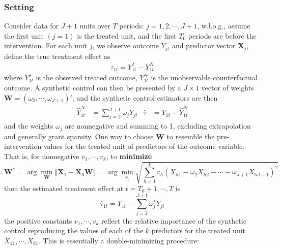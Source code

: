 \documentclass[twoside]{article}
\begin{document}
\subsubsection{Setting}
Consider data for $J+1$ units over $T$ periods: $j=1,2,\cdots,J+1$, w.l.o.g., assume the first unit $(j=1)$ is the treated unit, and the first $T_0$ periods are before the intervention. For each unit $j$, we observe outcome $Y_{jt}$ and predictor vector $\mathbf{X}_{j}$, define the true treatment effect as 
\begin{align*}
    \tau_{1t} = Y^I_{1t} - Y^N_{1t}
\end{align*}
where $Y^{I}_{1t}$ is the observed treated outcome, $Y^{N}_{1t}$ is the unobservable counterfactual outcome. A synthetic control can then be presented by a $J\times 1$ vector of weights $\mathbf{W}=\left(\omega_2,\cdots,\omega_{J+1}\right)'$, and the synthetic control estimators are then 
\begin{align*}
    \hat{Y}^N_{1t} &= \sum^{J+1}_{j=2}\omega_j Y_{jt} & \hat{\tau} &= Y_{1t}-\hat{Y}^N_{1t}
\end{align*}
and the weights $\omega_j$ are nonnegative and summing to 1, excluding extrapolation and generally grant sparsity.
One way to choose $\mathbf{W}$ to resemble the pre-intervention values for the treated unit of predictors of the outcome variable. 
That is, for nonnegative $v_1,\cdots,v_k$, to \textbf{minimize}
\begin{equation}\label{eq:synthetic_control_weight}
    \mathbf{W}^* = \arg\min_{\mathbf{W}} \left\Vert \mathbf{X}_1 - \mathbf{X}_0\mathbf{W} \right\Vert = \arg\min_{\omega_{j}} \sqrt{ \sum^k_{h=1}v_h \left(X_{h1}-\omega_2 X_{h2} - \cdots - \omega_{J+1} X_{hJ+1} \right)^2 }
\end{equation}
then the estimated treatment effect at $t=T_0+1,\cdots,T$ is $$ \hat{\tau}_{1t} = Y_{1t} - \sum^{J+1}_{j=2}\omega^*_j Y_{jt} $$
the positive constants $v_1,\cdots,v_k$ reflect the relative importance of the synthetic control reproducing the values of each of the $k$ predictors for the treated unit $X_{11},\cdots,X_{k1}$.
This is essentially a double-minimizing procedure: 
\end{document}
